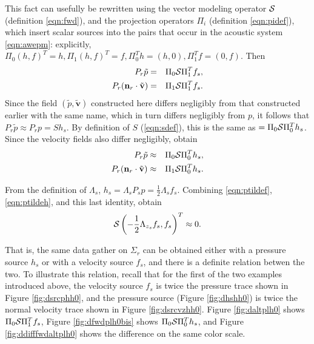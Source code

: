\documentclass[12pt]{geophysics}
\newcommand{\bv}{\mathbf{v}}
\begin{document}
This fact can usefully be rewritten using the vector modeling
operator ${\cal S}$ (definition \ref{eqn:fwd}), and the projection
operators $\Pi_i$ (definition \ref{eqn:pidef}), which insert scalar
sources into the pairs that occur in the acoustic system
\ref{eqn:awepm}: explicitly, $\Pi_0(h,f)^T = h, \Pi_1(h,f)^T = f,
\Pi_0^Th = (h,0), \Pi_1^Tf = (0,f)$. Then
\begin{eqnarray}
  P_r\tilde{p} &=& \Pi_0 {\cal S} \Pi_1^Tf_s, \nonumber \\
  P_r({\bf n}_r \cdot \tilde{\bv}) &=& \Pi_1 {\cal S} \Pi_1^Tf_s.
                                       \label{eqn:ptildef}
\end{eqnarray}
Since the field $(\tilde{p},\tilde{\bv})$ constructed here differs negligibly from that
constructed earlier with the same name, which in turn differs negligibly from $p$, it
follows that $P_r\tilde{p} \approx P_rp = Sh_s$. By definition of $S$
(\ref{eqn:sdef}), this is the same as $=\Pi_0{\cal
  S}\Pi_0^Th_s$. Since the velocity fields also differ negligibly,
obtain
\begin{eqnarray}
  P_r\tilde{p} & \approx & \Pi_0 {\cal S} \Pi_0^Th_s, \nonumber \\
  P_r({\bf n}_r \cdot \tilde{\bv}) & \approx & \Pi_1 {\cal S} \Pi_0^Th_s.
                                       \label{eqn:ptildeh}
\end{eqnarray}

From the definition of $\Lambda_s$, $h_s=\Lambda_sP_sp =
\frac{1}{2}\Lambda_sf_s$. Combining \ref{eqn:ptildef},
\ref{eqn:ptildeh}, and this last identity, obtain
\begin{equation}
  \label{eqn:snull}
  {\cal S}\left(-\frac{1}{2}\Lambda_{z_s}f_s,f_s\right)^T \approx 0.
\end{equation}

That is, the same data gather on $\Sigma_r$ can be obtained either
with a pressure source $h_s$ or with a velocity source $f_s$, and
there is a definite relation betwen the two. To illustrate this
relation, recall that for the first of the two examples introduced
above, the velocity source $f_s$ is twice the pressure trace shown in
Figure \ref{fig:dsrcphh0}, and the pressure source (Figure \ref{fig:dhshh0}) is twice the normal
velocity trace shown in Figure \ref{fig:dsrcvzhh0}.
Figure \ref{fig:daltplh0} shows $\Pi_0{\cal S}\Pi_1^Tf_s$, Figure
\ref{fig:dfwdplh0bis} shows $\Pi_0{\cal S}\Pi_0^Th_s$, and Figure
\ref{fig:ddifffwdaltplh0} shows the difference on the same color scale.
\end{document}
